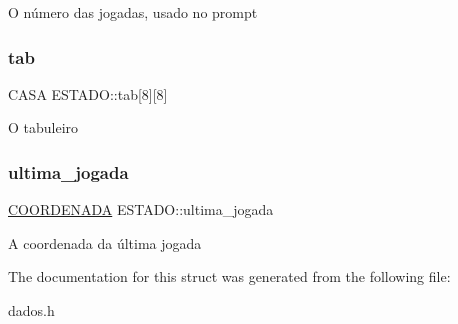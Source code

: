 O número das jogadas, usado no prompt \mbox{\label{structESTADO_ab56f0f1be16954d3768b4174d14c087d}} 
\subsubsection{\texorpdfstring{tab}{tab}}
{\footnotesize\ttfamily C\+A\+SA E\+S\+T\+A\+D\+O\+::tab\mbox{[}8\mbox{]}\mbox{[}8\mbox{]}}

O tabuleiro \mbox{\label{structESTADO_a4896a5c5c1f40b43fb795623327e3f47}} 
\subsubsection{\texorpdfstring{ultima\+\_\+jogada}{ultima\_jogada}}
{\footnotesize\ttfamily \hyperlink{structCOORDENADA}{C\+O\+O\+R\+D\+E\+N\+A\+DA} E\+S\+T\+A\+D\+O\+::ultima\+\_\+jogada}

A coordenada da última jogada 

The documentation for this struct was generated from the following file\+:\begin{DoxyCompactItemize}
\item 
dados.\+h\end{DoxyCompactItemize}
